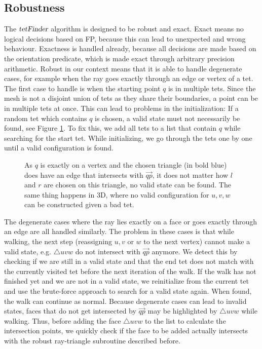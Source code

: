\documentclass[../thesis.tex]{subfiles}
\begin{document}
\subsection{Robustness}\label{subsec:degenerate}
The $\textsl{tetFinder}$ algorithm is designed to be robust and exact.
Exact means no logical decisions
based on FP, because this can lead to unexpected and wrong behaviour.
Exactness is handled already, because all decisions are made based on the orientation predicate,
which is made exact through arbitrary precision arithmetic.
Robust in our context means that it is able to handle degenerate cases, for example when
the ray goes exactly through an edge or vertex of a tet.
The first case to handle is when the starting point $q$ is in multiple tets.
Since the mesh is not a disjoint union of tets as they share their boundaries,
a point can be in multiple tets at once. This can lead to problems in the initialization:
If a random tet which contains $q$ is chosen, a valid state must not necessarily be found, see Figure \ref{fig:validstatefail}.
To fix this, we add all tets to a list that contain $q$ while searching for the start tet.
While initializing, we go through the tets one by one until a valid configuration is found.
\begin{figure}[htb]
  \centering
  \def\svgwidth{15em}
  
  \caption{As $q$ is exactly on a vertex and the chosen triangle (in bold blue) does
  have an edge that intersects with $\Vec{qp}$,
  it does not matter how $l$ and $r$ are chosen on this triangle, no valid state can be found.
  The same thing happens in 3D, where no valid configuration for $u,v,w$ can be constructed given a bad tet.
  }\label{fig:validstatefail}
\end{figure}
The degenerate cases where the ray lies exactly on a face or goes exactly through an edge are all handled similarly.
The problem in these cases is that while walking, the next step (reassigning $u,v$ or $w$ to the next vertex) cannot
make a valid state, e.g. $\triangle uvw$ do not intersect with $\Vec{qp}$ anymore.
We detect this by checking if we are still in a valid state and that the end tet does not
match with the currently visited tet before the next iteration of the walk.
If the walk has not finished yet and we are not in a valid state, we reinitialize from the current tet and use the brute-force approach to search
for a valid state again. When found, the walk can continue as normal.
Because degenerate cases can lead to invalid states, faces that do not get intersected
by $\Vec{qp}$ may be highlighted by $\triangle uvw$ while walking.
Thus, before adding the face $\triangle uvw$ to the list to calculate the intersection points,
we quickly check if the face to be added actually intersects with the robust ray-triangle subroutine described before.
\end{document}
